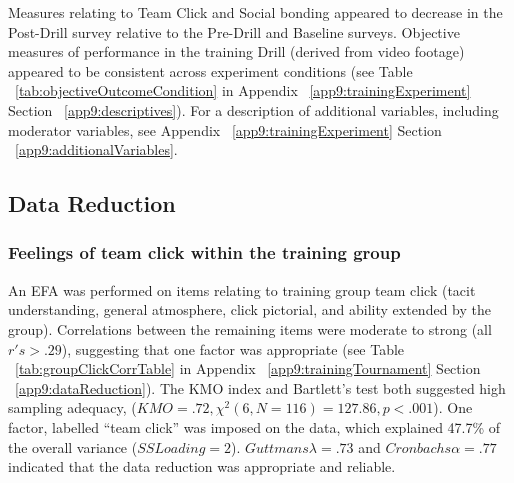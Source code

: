 Measures relating to Team Click and Social bonding appeared to decrease in the Post-Drill survey relative to the Pre-Drill and Baseline surveys.  Objective measures of performance in the training Drill (derived from video footage) appeared to be consistent across experiment conditions (see Table ~\ref{tab:objectiveOutcomeCondition} in Appendix ~\ref{app9:trainingExperiment} Section ~\ref{app9:descriptives}).
For a description of additional variables, including moderator variables, see Appendix ~\ref{app9:trainingExperiment} Section ~\ref{app9:additionalVariables}.










\subsection{Data Reduction}

\subsubsection{Feelings of team click within the training group}
An EFA was performed on items relating to training group team click (tacit understanding, general atmosphere, click pictorial, and ability extended by the group).  Correlations between the remaining items were moderate to strong (all $r's > .29$), suggesting that one factor was appropriate (see Table ~\ref{tab:groupClickCorrTable} in Appendix ~\ref{app9:trainingTournament} Section ~\ref{app9:dataReduction}). The KMO index and Bartlett's test both suggested high sampling adequacy, ($KMO =  .72, \chi^2(6, N = 116) = 127.86, p < .001$). One factor, labelled ``team click'' was imposed on the data, which explained 47.7\% of the overall variance ($SS Loading = 2$). $Guttmans \lambda = .73$ and $Cronbachs \alpha = .77$ indicated that the data reduction was appropriate and reliable.

